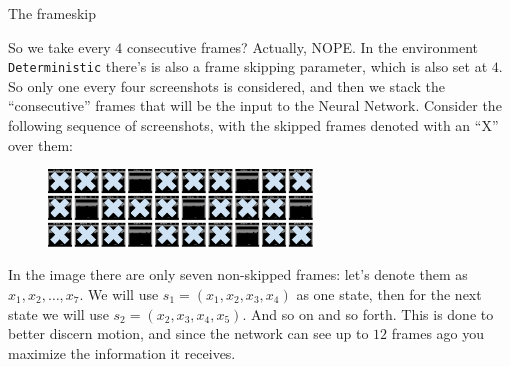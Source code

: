 \documentclass[10pt, aspectratio=169, compress, protectframetitle, handout]{beamer}
\begin{document}
\begin{frame}{The frameskip}

    So we take every $4$ consecutive frames? Actually, NOPE. In the environment \texttt{Deterministic} there's is also a frame skipping parameter, which is also set at $4$. So only one every four screenshots is considered, and then we stack the ``consecutive'' frames that will be the input to the Neural Network. Consider the following sequence of screenshots, with the skipped frames denoted with an ``X'' over them:
    
    \begin{figure}
        \centering
        \includegraphics[width=7cm]{figures/breakout_subsampled.png}
    \end{figure}
    
    In the image there are only seven non-skipped frames: let's denote them as $x_1, x_2, \ldots, x_7$. We will use $s_1 = (x_1, x_2, x_3, x_4)$ as one state, then for the next state we will use $s_2 = (x_2, x_3, x_4, x_5)$. And so on and so forth. This is done to \alert{better discern motion}, and since the network can see up to $12$ frames ago you \alert{maximize the information} it receives.
    
    
\end{frame}
\end{document}
